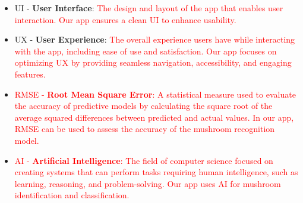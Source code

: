 \documentclass{article}
\begin{document}
\begin{itemize}
    \item UI - \textbf{User Interface}: \textcolor{red}{The design and layout of the app that enables user interaction. Our app ensures a clean UI to enhance usability.}
    \item UX - \textbf{User Experience}: \textcolor{red}{The overall experience users have while interacting with the app, including ease of use and satisfaction. Our app focuses on optimizing UX by providing seamless navigation, accessibility, and engaging features.}
	\item \textcolor{red}{RMSE - \textbf{Root Mean Square Error}: A statistical measure used to evaluate the accuracy of predictive models by calculating the square root of the average squared differences between predicted and actual values. In our app, RMSE can be used to assess the accuracy of the mushroom recognition model.}
	\item \textcolor{red}{AI - \textbf{Artificial Intelligence}: The field of computer science focused on creating systems that can perform tasks requiring human intelligence, such as learning, reasoning, and problem-solving. Our app uses AI for mushroom identification and classification.}

\end{itemize}

\end{document}
